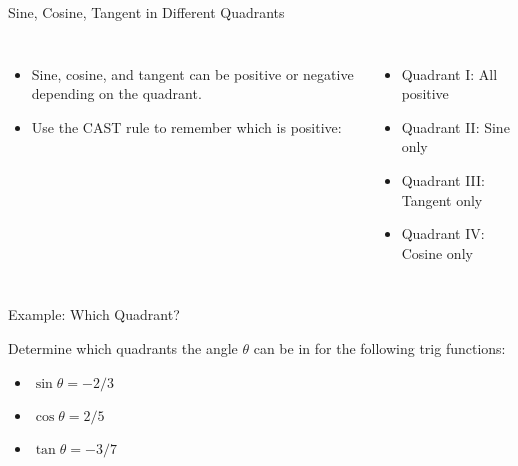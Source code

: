 \documentclass[aspectratio=169]{beamer}
\begin{document}
\begin{frame}{Sine, Cosine, Tangent in Different Quadrants}
    \begin{tcolorbox}[colback=lightgray,colframe=accent,title=CAST Rule]
        \footnotesize
        \begin{columns}
            \begin{itemize}
                \item Sine, cosine, and tangent can be positive or negative depending on the quadrant.
                \item Use the CAST rule to remember which is positive:
            \end{itemize}
            \begin{itemize}
                \item Quadrant I: All positive
                \item Quadrant II: Sine only
                \item Quadrant III: Tangent only
                \item Quadrant IV: Cosine only
            \end{itemize}
        \end{columns}
    \end{tcolorbox}
\end{frame}

\begin{frame}{Example: Which Quadrant?}
    \begin{tcolorbox}[colback=lightgray,colframe=primary,title=Question]
        \footnotesize
        Determine which quadrants the angle $\theta$ can be in for the following trig functions:
        \begin{itemize}
            \item $\sin\theta = -2/3$
            \item $\cos\theta = 2/5$
            \item $\tan\theta = -3/7$
        \end{itemize}
    \end{tcolorbox}
\end{frame}
\end{document}
